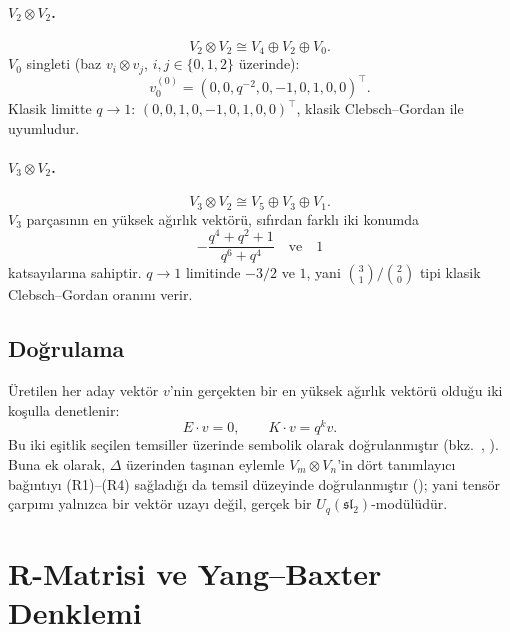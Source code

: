 \documentclass[10pt]{math}
\numberwithin{equation}{section}
\theoremstyle{plain}
\theoremstyle{definition}
\renewcommand{\sl}{\mathfrak{sl}}
\newcommand{\Uq}{U_q(\sl_2)}
\newcommand{\cop}{\Delta}
\newcommand{\hwt}{v_0}
\begin{document}
\paragraph{$V_2 \otimes V_2$.}
\[
  V_2 \otimes V_2 \cong V_4 \oplus V_2 \oplus V_0.
\]
$V_0$ singleti (baz $v_i \otimes v_j$, $i,j \in \{0,1,2\}$ üzerinde):
\[
  \hwt^{(0)} = (0, 0, q^{-2}, 0, -1, 0, 1, 0, 0)^\top.
\]
Klasik limitte $q \to 1$: $(0,0,1,0,-1,0,1,0,0)^\top$, klasik
Clebsch--Gordan ile uyumludur.

\paragraph{$V_3 \otimes V_2$.}
\[
  V_3 \otimes V_2 \cong V_5 \oplus V_3 \oplus V_1.
\]
$V_3$ parçasının en yüksek ağırlık vektörü, sıfırdan farklı iki konumda
\[
  -\frac{q^4 + q^2 + 1}{q^6 + q^4} \quad\text{ve}\quad 1
\]
katsayılarına sahiptir. $q \to 1$ limitinde $-3/2$ ve $1$, yani
$\binom{3}{1}/\binom{2}{0}$ tipi klasik Clebsch--Gordan oranını verir.

\subsection{Doğrulama}

Üretilen her aday vektör $v$'nin gerçekten bir en yüksek ağırlık vektörü olduğu
iki koşulla denetlenir:
\[
  E \cdot v = 0, \qquad K \cdot v = q^k v.
\]
Bu iki eşitlik seçilen temsiller üzerinde sembolik olarak doğrulanmıştır
(bkz.\ , ).
Buna ek olarak, $\cop$ üzerinden taşınan eylemle $V_m \otimes V_n$'in dört
tanımlayıcı bağıntıyı (R1)--(R4) sağladığı da temsil düzeyinde doğrulanmıştır
(); yani tensör çarpımı yalnızca bir
vektör uzayı değil, gerçek bir $\Uq$-modülüdür.

\section{R-Matrisi ve Yang--Baxter Denklemi}
\end{document}
